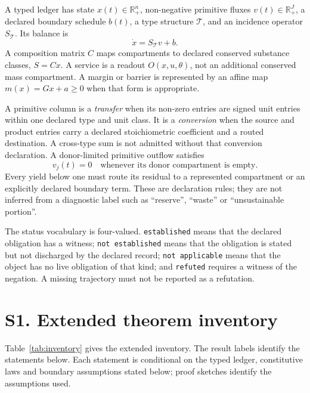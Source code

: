 \documentclass[11pt]{article}
\newcommand{\est}{\texttt{established}}
\newcommand{\nesta}{\texttt{not established}}
\newcommand{\na}{\texttt{not applicable}}
\newcommand{\Rpos}{\mathbb{R}_{+}}
\begin{document}
A typed ledger has state $x(t)\in\Rpos^n$, non-negative primitive fluxes $v(t)\in\Rpos^J$, a declared boundary schedule $b(t)$, a type structure $\mathcal T$, and an incidence operator $S_{\mathcal T}$. Its balance is
\begin{equation}
\dot x=S_{\mathcal T}v+b.\label{eq:s0-balance}
\end{equation}
A composition matrix $C$ maps compartments to declared conserved substance classes, $S=Cx$. A service is a readout $O(x,u,\theta)$, not an additional conserved mass compartment. A margin or barrier is represented by an affine map $m(x)=Gx+a\geq0$ when that form is appropriate.

A primitive column is a \emph{transfer} when its non-zero entries are signed unit entries within one declared type and unit class. It is a \emph{conversion} when the source and product entries carry a declared stoichiometric coefficient and a routed destination. A cross-type sum is not admitted without that conversion declaration. A donor-limited primitive outflow satisfies
\begin{equation}
v_j(t)=0\quad\text{whenever its donor compartment is empty}.\label{eq:s0-donor}
\end{equation}
Every yield below one must route its residual to a represented compartment or an explicitly declared boundary term. These are declaration rules; they are not inferred from a diagnostic label such as ``reserve'', ``waste'' or ``unsustainable portion''.

The status vocabulary is four-valued. \est{} means that the declared obligation has a witness; \nesta{} means that the obligation is stated but not discharged by the declared record; \na{} means that the object has no live obligation of that kind; and \texttt{refuted} requires a witness of the negation. A missing trajectory must not be reported as a refutation.

\section*{S1. Extended theorem inventory}

Table~\ref{tab:inventory} gives the extended inventory. The result labels identify the statements below. Each statement is conditional on the typed ledger, constitutive laws and boundary assumptions stated below; proof sketches identify the assumptions used.
\end{document}
